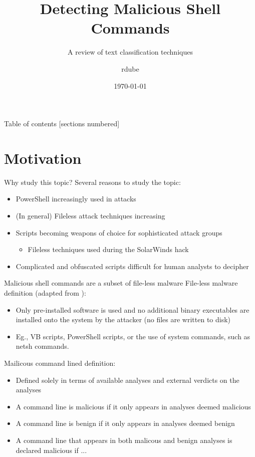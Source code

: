 \documentclass[10pt]{beamer}
\title{Detecting Malicious Shell Commands}
\subtitle{A review of text classification techniques}
\date{\today}
\author{rdube}
\begin{document}
\maketitle

\begin{frame}{Table of contents}
  [sections numbered]
  \tableofcontents[hideallsubsections]
\end{frame}

\section{Motivation}

\begin{frame}[fragile]{Why study this topic?}
	Several reasons to study the topic:
	\begin{itemize}
		\item PowerShell increasingly used in attacks \cite{symc2016}
		\item (In general) Fileless attack techniques increasing \cite{symc2017}
		\item Scripts becoming weapons of choice for sophisticated attack groups \cite{msft2017-2}
		\begin{itemize}
			\item Fileless techniques used during the SolarWinds hack \cite{zdnet2021}
		\end{itemize}
		\item Complicated and obfuscated scripts difficult for human analysts to decipher \cite{feye2018}
	\end{itemize}
\end{frame}

\begin{frame}{Malicious shell commands are a subset of file-less malware}
	File-less malware definition (adapted from \cite{symc2017}):
	\begin{itemize}
		\item Only pre-installed software is used and no additional binary executables are installed onto the system by the attacker (no files are written to disk)
		\item Eg., VB scripts, PowerShell scripts, or the use of system commands, such as netsh commands.
	\end{itemize}
	Mailicous command lined definition:
	\begin{itemize}
		\item Defined solely in terms of available analyses and external verdicts on the analyses
		\item A command line is malicious if it only appears in analyses deemed malicious 
		\item A command line is benign if it only appears in analyses deemed benign
		\item A command line that appears in both malicous and benign analyses is declared malicious if ...
	\end{itemize}
\end{frame}
\end{document}
